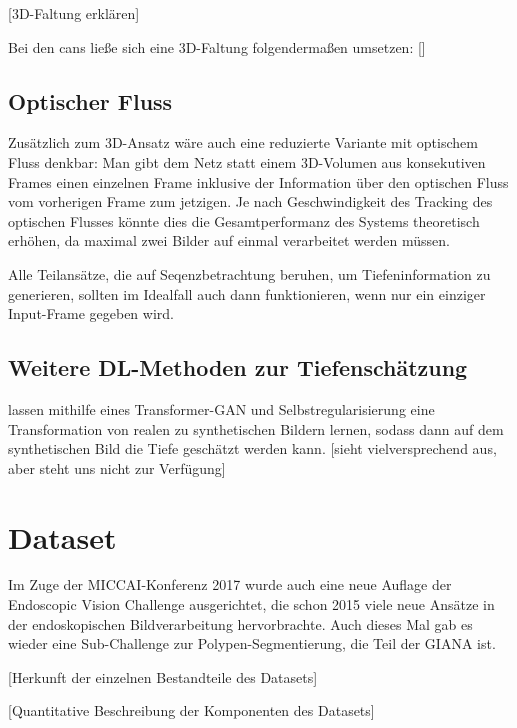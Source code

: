 [3D-Faltung erklären]

Bei den \glspl{can} ließe sich eine 3D-Faltung folgendermaßen umsetzen:
[]

\subsection{Optischer Fluss}

Zusätzlich zum 3D-Ansatz wäre auch eine reduzierte Variante mit optischem Fluss denkbar:
Man gibt dem Netz statt einem 3D-Volumen aus konsekutiven Frames einen einzelnen Frame inklusive der Information über den optischen Fluss vom vorherigen Frame zum jetzigen.
Je nach Geschwindigkeit des Tracking des optischen Flusses könnte dies die Gesamtperformanz des Systems theoretisch erhöhen, da maximal zwei Bilder auf einmal verarbeitet werden müssen.

Alle Teilansätze, die auf Seqenzbetrachtung beruhen, um Tiefeninformation zu generieren, sollten im Idealfall auch dann funktionieren, wenn nur ein einziger Input-Frame gegeben wird.

\subsection{Weitere DL-Methoden zur Tiefenschätzung}

\citeauthor{Mahmood.20171129} lassen mithilfe eines Transformer-GAN und Selbstregularisierung eine Transformation von realen zu synthetischen Bildern lernen, sodass dann auf dem synthetischen Bild die Tiefe geschätzt werden kann.
[sieht vielversprechend aus, aber steht uns nicht zur Verfügung]

\section{Dataset}

Im Zuge der MICCAI-Konferenz 2017 wurde auch eine neue Auflage der Endoscopic Vision Challenge ausgerichtet, die schon 2015 viele neue Ansätze in der endoskopischen Bildverarbeitung hervorbrachte.
Auch dieses Mal gab es wieder eine Sub-Challenge zur Polypen-Segmentierung, die Teil der GIANA ist.

[Herkunft der einzelnen Bestandteile des Datasets]

[Quantitative Beschreibung der Komponenten des Datasets]
